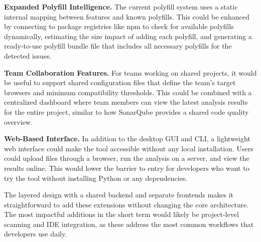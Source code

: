 \textbf{Expanded Polyfill Intelligence.} The current polyfill system uses a static internal mapping between features and known polyfills. This could be enhanced by connecting to package registries like npm to check for available polyfills dynamically, estimating the size impact of adding each polyfill, and generating a ready-to-use polyfill bundle file that includes all necessary polyfills for the detected issues.

\textbf{Team Collaboration Features.} For teams working on shared projects, it would be useful to support shared configuration files that define the team's target browsers and minimum compatibility thresholds. This could be combined with a centralized dashboard where team members can view the latest analysis results for the entire project, similar to how SonarQube provides a shared code quality overview.

\textbf{Web-Based Interface.} In addition to the desktop GUI and CLI, a lightweight web interface could make the tool accessible without any local installation. Users could upload files through a browser, run the analysis on a server, and view the results online. This would lower the barrier to entry for developers who want to try the tool without installing Python or any dependencies.

The layered design with a shared backend and separate frontends makes it straightforward to add these extensions without changing the core architecture. The most impactful additions in the short term would likely be project-level scanning and IDE integration, as these address the most common workflows that developers use daily.
